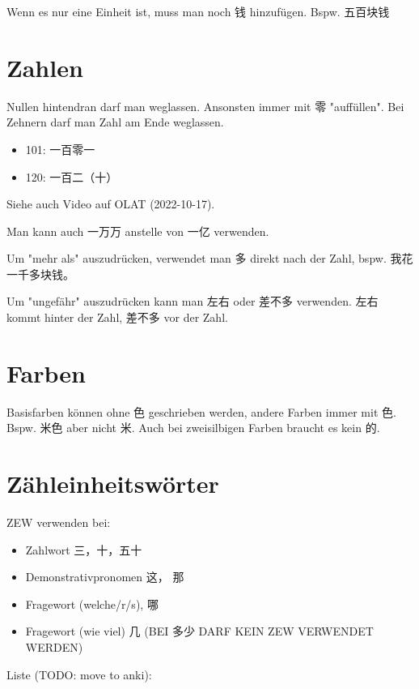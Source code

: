 \documentclass[UTF8]{ctexart}
\begin{document}
Wenn es nur eine Einheit ist, muss man noch 钱 hinzufügen. Bspw. 五百块钱

\section{Zahlen}

Nullen hintendran darf man weglassen. Ansonsten immer mit 零 "auffüllen". Bei Zehnern darf man Zahl am Ende weglassen.

\begin{itemize}
    \item 101: 一百零一
    \item 120: 一百二（十）
\end{itemize}

Siehe auch Video auf OLAT (2022-10-17).

Man kann auch 一万万 anstelle von 一亿 verwenden.

Um "mehr als" auszudrücken, verwendet man 多 direkt nach der Zahl, bspw. 我花一千多块钱。

Um "ungefähr" auszudrücken kann man 左右 oder 差不多 verwenden. 左右 kommt hinter der Zahl, 差不多 vor der Zahl.

\section{Farben}

Basisfarben können ohne 色 geschrieben werden, andere Farben immer mit 色. Bspw. 米色 aber nicht 米. Auch bei zweisilbigen Farben braucht es kein 的.

\section{Zähleinheitswörter}

ZEW verwenden bei:

\begin{itemize}
    \item Zahlwort 三，十，五十
    \item Demonstrativpronomen 这， 那
    \item Fragewort (welche/r/s), 哪
    \item Fragewort (wie viel) 几 (BEI 多少 DARF KEIN ZEW VERWENDET WERDEN)
\end{itemize}

Liste (TODO: move to anki):
\end{document}
